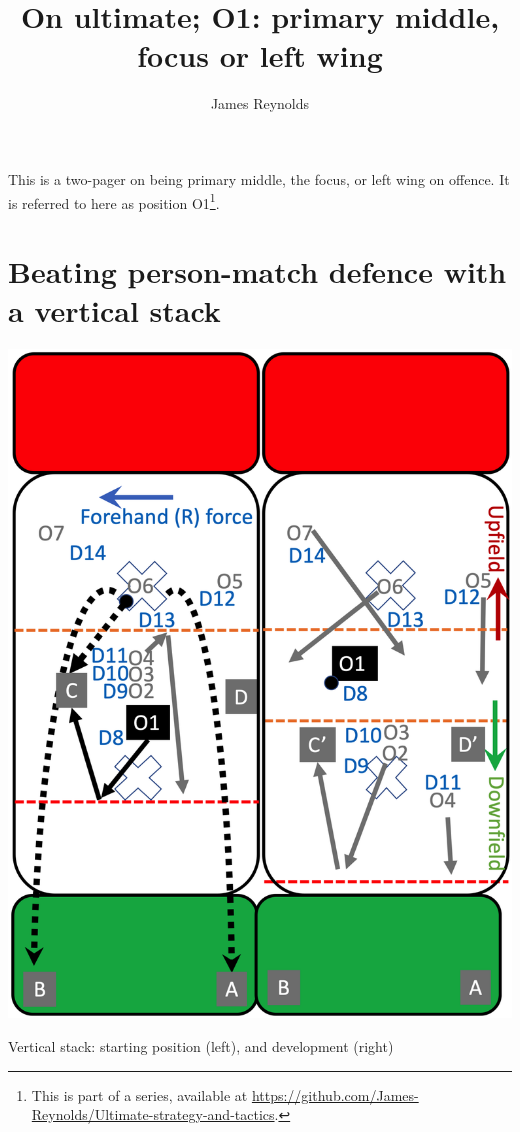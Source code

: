 \documentclass{tufte-handout}
\title{On ultimate; O1: primary middle, focus or left wing}
\author[James Reynolds]{James Reynolds}
\begin{document}
\maketitle%



This is 
a two-pager 
on being 
primary middle, 
the focus, 
or left wing 
on offence. 
It is  
referred to here 
as position O1\footnote{
This
is part of a series, 
available at
\url{https://github.com/James-Reynolds/Ultimate-strategy-and-tactics}.}.


\section{Beating person-match defence with a vertical stack}\label{sec:vertical}

\begin{marginfigure}%
  \includegraphics[width=\linewidth]{O1-vertical}
  \caption{Vertical stack: 
  starting position (left),
  and development (right)}
  \label{fig:O1-vertical}
\end{marginfigure}
\end{document}
